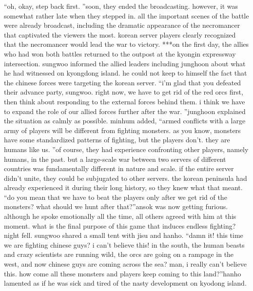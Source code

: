 “oh, okay, step back first.
”soon, they ended the broadcasting.
however, it was somewhat rather late when they stepped in.
 all the important scenes of the battle were already broadcast, including the dramatic appearance of the necromancer that captivated the viewers the most.
korean server players clearly recognized that the necromancer would lead the war to victory.
***on the first day, the allies who had won both battles returned to the outpost at the kyongin expressway intersection.
sungwoo informed the allied leaders including junghoon about what he had witnessed on kyongdong island.
 he could not keep to himself the fact that the chinese forces were targeting the korean server.
“i’m glad that you defeated their advance party, sungwoo.
 right now, we have to get rid of the red orcs first, then think about responding to the external forces behind them.
 i think we have to expand the role of our allied forces further after the war.
”junghoon explained the situation as calmly as possible.
minhum added, “armed conflicts with a large army of players will be different from fighting monsters.
 as you know, monsters have some standardized patterns of fighting, but the players don’t.
 they are humans like us.
”of course, they had experience confronting other players, namely humans, in the past.
but a large-scale war between two servers of different countries was fundamentally different in nature and scale.
if the entire server didn’t unite, they could be subjugated to other servers.
 the korean peninsula had already experienced it during their long history, so they knew what that meant.
“do you mean that we have to beat the players only after we get rid of the monsters? what should we hunt after that?”ansok was now getting furious.
 although he spoke emotionally all the time, all others agreed with him at this moment.
 what is the final purpose of this game that induces endless fighting?night fell.
 sungwoo shared a small tent with jisu and hanho.
“damn it! this time we are fighting chinese guys? i can’t believe this! in the south, the human beasts and crazy scientists are running wild, the orcs are going on a rampage in the west, and now chinese guys are coming across the sea? man, i really can’t believe this.
 how come all these monsters and players keep coming to this land?”hanho lamented as if he was sick and tired of the nasty development on kyodong island.


 